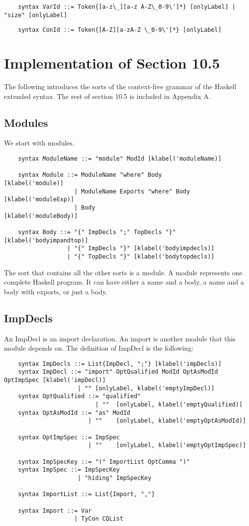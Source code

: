 \begin{lstlisting}
    syntax VarId ::= Token{[a-z\_][a-z A-Z\_0-9\']*} [onlyLabel] | "size" [onlyLabel]
\end{lstlisting}
\begin{lstlisting}
    syntax ConId ::= Token{[A-Z][a-zA-Z \_0-9\']*} [onlyLabel]
\end{lstlisting}

\section{Implementation of Section 10.5}
The following introduces the sorts of the context-free grammar of the Haskell extended syntax. The rest of section 10.5 is included in Appendix A.

\subsection{Modules}
We start with modules.
\begin{lstlisting}
    syntax ModuleName ::= "module" ModId [klabel('moduleName)]

    syntax Module ::= ModuleName "where" Body          [klabel('module)]
                    | ModuleName Exports "where" Body  [klabel('moduleExp)]
                    | Body                             [klabel('moduleBody)]

    syntax Body ::= "{" ImpDecls ";" TopDecls "}" [klabel('bodyimpandtop)]
                  | "{" ImpDecls "}" [klabel('bodyimpdecls)]
                  | "{" TopDecls "}" [klabel('bodytopdecls)]
\end{lstlisting}

The sort that contains all the other sorts is a module. A module represents one complete Haskell program. It can have either a name and a body, a name and a body with exports, or just a body.

\subsection{ImpDecls}
An ImpDecl is an import declaration. An import is another module that this module depends on.
The definition of ImpDecl is the following:
\begin{lstlisting}
    syntax ImpDecls ::= List{ImpDecl, ";"} [klabel('impDecls)]
    syntax ImpDecl ::= "import" OptQualified ModId OptAsModId OptImpSpec [klabel('impDecl)]
                     | "" [onlyLabel, klabel('emptyImpDecl)]
    syntax OptQualified ::= "qualified"
                          | ""  [onlyLabel, klabel('emptyQualified)]
    syntax OptAsModId ::= "as" ModId
                        | ""    [onlyLabel, klabel('emptyOptAsModId)]

    syntax OptImpSpec ::= ImpSpec
                        | ""    [onlyLabel, klabel('emptyOptImpSpec)]

    syntax ImpSpecKey ::= "(" ImportList OptComma ")"
    syntax ImpSpec ::= ImpSpecKey
                     | "hiding" ImpSpecKey

    syntax ImportList ::= List{Import, ","}

    syntax Import ::= Var
                    | TyCon CQList
\end{lstlisting}

